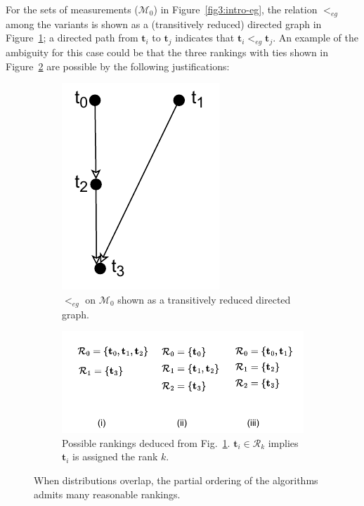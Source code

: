 \documentclass[acmsmall,screen, review]{acmart}
\begin{document}
For the sets of measurements ($\mathcal{M}_0$) in Figure~\ref{fig3:intro-eg}, the relation $<_{eg}$ among the variants is shown as a (transitively reduced) directed graph in Figure~\ref{fig:intro-dfgl}; a directed path from $\mathbf{t}_i$ to $\mathbf{t}_j$ indicates that $\mathbf{t}_i <_{eg} \mathbf{t}_j$. 
An example of the ambiguity for this case could be that the three rankings with ties shown in Figure~\ref{fig:intro-rank} are possible by the following justifications:

\begin{figure}[h!]
	\centering

	\begin{subfigure}[b]{0.48\textwidth}
		\centering
		\includegraphics[width=0.3\linewidth]{fig/ch3/pr-def-partial.pdf}
		\caption{$<_{eg}$ on $\mathcal{M}_0$ shown as a transitively reduced directed graph.}
		\label{fig:intro-dfgl}
	\end{subfigure}
	\hfill
	\begin{subfigure}[b]{0.48\textwidth}
		\includegraphics[width=0.8\linewidth]{fig/ch3/pr-def-rank-partial.pdf}
		\caption{Possible rankings deduced from Fig.~\ref{fig:intro-dfgl}. $\mathbf{t}_i \in \mathcal{R}_k$ implies $\mathbf{t}_i$ is assigned the rank $k$.}
		\label{fig:intro-rank}
	\end{subfigure}
	\caption{When distributions overlap, the partial ordering of the algorithms admits many reasonable rankings.}
	\label{fig:intro}
\end{figure}
\end{document}

